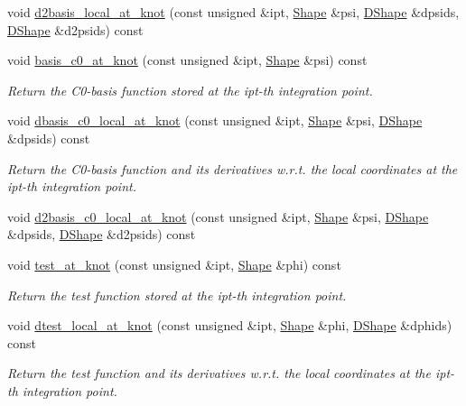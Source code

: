 \begin{DoxyCompactItemize}
void \hyperlink{classoomph_1_1BellElementBase_ae5a43211398722298cf88ded87dee6ab}{d2basis\+\_\+local\+\_\+at\+\_\+knot} (const unsigned \&ipt, \hyperlink{classoomph_1_1Shape}{Shape} \&psi, \hyperlink{classoomph_1_1DShape}{D\+Shape} \&dpsids, \hyperlink{classoomph_1_1DShape}{D\+Shape} \&d2psids) const
\item 
void \hyperlink{classoomph_1_1BellElementBase_a0952ed8fcba04688fdf895dc25bb8c30}{basis\+\_\+c0\+\_\+at\+\_\+knot} (const unsigned \&ipt, \hyperlink{classoomph_1_1Shape}{Shape} \&psi) const
\begin{DoxyCompactList}\small\item\em Return the C0-\/basis function stored at the ipt-\/th integration point. \end{DoxyCompactList}\item 
void \hyperlink{classoomph_1_1BellElementBase_a1d20473bb357a28c9aeea91454b4c959}{dbasis\+\_\+c0\+\_\+local\+\_\+at\+\_\+knot} (const unsigned \&ipt, \hyperlink{classoomph_1_1Shape}{Shape} \&psi, \hyperlink{classoomph_1_1DShape}{D\+Shape} \&dpsids) const
\begin{DoxyCompactList}\small\item\em Return the C0-\/basis function and its derivatives w.\+r.\+t. the local coordinates at the ipt-\/th integration point. \end{DoxyCompactList}\item 
void \hyperlink{classoomph_1_1BellElementBase_ac452af5196c5a49040a2d6ab871a1284}{d2basis\+\_\+c0\+\_\+local\+\_\+at\+\_\+knot} (const unsigned \&ipt, \hyperlink{classoomph_1_1Shape}{Shape} \&psi, \hyperlink{classoomph_1_1DShape}{D\+Shape} \&dpsids, \hyperlink{classoomph_1_1DShape}{D\+Shape} \&d2psids) const
\item 
void \hyperlink{classoomph_1_1BellElementBase_aa838429de6549ebb7b9c6d47b17b7859}{test\+\_\+at\+\_\+knot} (const unsigned \&ipt, \hyperlink{classoomph_1_1Shape}{Shape} \&phi) const
\begin{DoxyCompactList}\small\item\em Return the test function stored at the ipt-\/th integration point. \end{DoxyCompactList}\item 
void \hyperlink{classoomph_1_1BellElementBase_a5ca86e4bbc0c1c0df2554e02669a0949}{dtest\+\_\+local\+\_\+at\+\_\+knot} (const unsigned \&ipt, \hyperlink{classoomph_1_1Shape}{Shape} \&phi, \hyperlink{classoomph_1_1DShape}{D\+Shape} \&dphids) const
\begin{DoxyCompactList}\small\item\em Return the test function and its derivatives w.\+r.\+t. the local coordinates at the ipt-\/th integration point. \end{DoxyCompactList}\item 

\end{DoxyCompactItemize}
